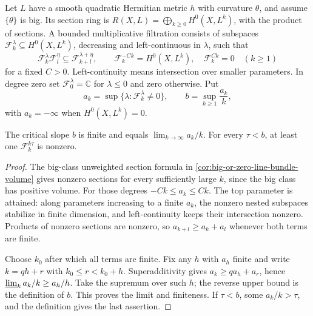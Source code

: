 \begin{definition}\label{def:multiplicative-section-filtration}
Let $L$ have a smooth quadratic Hermitian metric $h$ with curvature $\theta$, and assume $\{\theta\}$ is big. Its section ring is
$R(X,L)=\bigoplus_{k\geq0}H^0(X,L^k)$, with the product of sections. A bounded multiplicative filtration consists of subspaces $\mathcal F_k^\lambda\subseteq H^0(X,L^k)$, decreasing and left-continuous in $\lambda$, such that
\[
 \mathcal F_k^\lambda\mathcal F_l^\eta
                       \subseteq\mathcal F_{k+l}^{\lambda+\eta},\qquad
 \mathcal F_k^{-Ck}=H^0(X,L^k),\quad
 \mathcal F_k^{Ck}=0\quad(k\geq1)
\]
for a fixed $C>0$. Left-continuity means intersection over smaller parameters. In degree zero set $\mathcal F_0^\lambda=\mathbb C$ for $\lambda\leq0$ and zero otherwise. Put
\[
 a_k=\sup\{\lambda:\mathcal F_k^\lambda\ne0\},\qquad
              b=\sup_{k\geq1}\frac{a_k}{k},
\]
with $a_k=-\infty$ when $H^0(X,L^k)=0$.
\end{definition}

\begin{lemma}\label{lem:filtration-critical-slope}
The critical slope $b$ is finite and equals $\lim_{k\to\infty}a_k/k$. For every $\tau<b$, at least one $\mathcal F_k^{k\tau}$ is nonzero.
\end{lemma}
\begin{proof}
The big-class unweighted section formula in \cref{cor:big-or-zero-line-bundle-volume} gives nonzero sections for every sufficiently large $k$, since the big class has positive volume. For those degrees $-Ck\leq a_k\leq Ck$. The top parameter is attained: along parameters increasing to a finite $a_k$, the nonzero nested subspaces stabilize in finite dimension, and left-continuity keeps their intersection nonzero. Products of nonzero sections are nonzero, so $a_{k+l}\geq a_k+a_l$ whenever both terms are finite.

Choose $k_0$ after which all terms are finite. Fix any $h$ with $a_h$ finite and write $k=qh+r$ with $k_0\leq r<k_0+h$. Superadditivity gives $a_k\geq qa_h+a_r$, hence
$\varliminf_k a_k/k\geq a_h/h$.
Take the supremum over such $h$; the reverse upper bound is the definition of $b$. This proves the limit and finiteness. If $\tau<b$, some $a_k/k>\tau$, and the definition gives the last assertion.
\end{proof}

